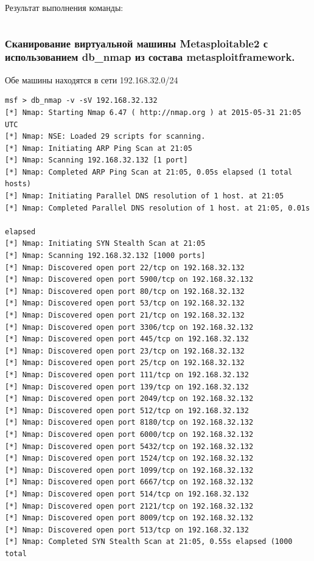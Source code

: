 \documentclass[a4paper, 14pt]{article}				%
\begin{document}
Результат выполнения команды:
\begin{Verbatim}[frame=single]

\end{Verbatim}

\subsubsection{Сканирование виртуальной машины Metasploitable2 с использованием db\_nmap из состава metasploitframework.}
Обе машины находятся в сети 192.168.32.0/24
\begin{Verbatim}[frame=single]
msf > db_nmap -v -sV 192.168.32.132
[*] Nmap: Starting Nmap 6.47 ( http://nmap.org ) at 2015-05-31 21:05 UTC
[*] Nmap: NSE: Loaded 29 scripts for scanning.
[*] Nmap: Initiating ARP Ping Scan at 21:05
[*] Nmap: Scanning 192.168.32.132 [1 port]
[*] Nmap: Completed ARP Ping Scan at 21:05, 0.05s elapsed (1 total hosts)
[*] Nmap: Initiating Parallel DNS resolution of 1 host. at 21:05
[*] Nmap: Completed Parallel DNS resolution of 1 host. at 21:05, 0.01s
                                                                      elapsed
[*] Nmap: Initiating SYN Stealth Scan at 21:05
[*] Nmap: Scanning 192.168.32.132 [1000 ports]
[*] Nmap: Discovered open port 22/tcp on 192.168.32.132
[*] Nmap: Discovered open port 5900/tcp on 192.168.32.132
[*] Nmap: Discovered open port 80/tcp on 192.168.32.132
[*] Nmap: Discovered open port 53/tcp on 192.168.32.132
[*] Nmap: Discovered open port 21/tcp on 192.168.32.132
[*] Nmap: Discovered open port 3306/tcp on 192.168.32.132
[*] Nmap: Discovered open port 445/tcp on 192.168.32.132
[*] Nmap: Discovered open port 23/tcp on 192.168.32.132
[*] Nmap: Discovered open port 25/tcp on 192.168.32.132
[*] Nmap: Discovered open port 111/tcp on 192.168.32.132
[*] Nmap: Discovered open port 139/tcp on 192.168.32.132
[*] Nmap: Discovered open port 2049/tcp on 192.168.32.132
[*] Nmap: Discovered open port 512/tcp on 192.168.32.132
[*] Nmap: Discovered open port 8180/tcp on 192.168.32.132
[*] Nmap: Discovered open port 6000/tcp on 192.168.32.132
[*] Nmap: Discovered open port 5432/tcp on 192.168.32.132
[*] Nmap: Discovered open port 1524/tcp on 192.168.32.132
[*] Nmap: Discovered open port 1099/tcp on 192.168.32.132
[*] Nmap: Discovered open port 6667/tcp on 192.168.32.132
[*] Nmap: Discovered open port 514/tcp on 192.168.32.132
[*] Nmap: Discovered open port 2121/tcp on 192.168.32.132
[*] Nmap: Discovered open port 8009/tcp on 192.168.32.132
[*] Nmap: Discovered open port 513/tcp on 192.168.32.132
[*] Nmap: Completed SYN Stealth Scan at 21:05, 0.55s elapsed (1000 total

\end{Verbatim}
\end{document}
